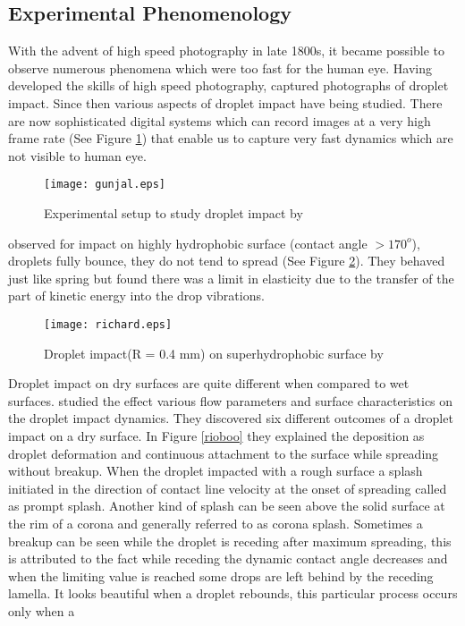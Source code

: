 \subsection{Experimental Phenomenology}
With the advent of high speed photography in late 1800s, it became possible to observe numerous phenomena which were too fast for the human eye.
Having developed the skills of high speed photography, \cite{Worthington1908} captured photographs of droplet impact. Since then various aspects of
droplet impact have being studied. There are now sophisticated digital systems which can record images at a very high frame rate 
(See Figure \ref{gunjal}) that enable us to capture very fast dynamics which are not visible to human eye.
\begin{figure}[tbp]
\centering
 \texttt{[image: gunjal.eps]}
 \caption[Experimental setup to study droplet impact]{Experimental setup to study droplet impact by \cite{Gunjal2005}}
 \label{gunjal}
\end{figure}
\cite{Richard2000} observed for impact on highly hydrophobic surface (contact angle $ > 170^o$), droplets fully bounce, they 
do not tend to spread (See Figure \ref{richard}). They behaved just like spring but found there was a limit in elasticity due to the transfer
of the part of kinetic energy into the drop vibrations.
\begin{figure}[tbp]
\centering
 \texttt{[image: richard.eps]}
 \caption[Droplet impact on superhydrophobic surface]{Droplet impact(R = 0.4 mm) on superhydrophobic surface
 by \cite{Richard2000} }
 \label{richard}
\end{figure}
Droplet impact on dry surfaces are quite different when compared to wet surfaces. \cite{Rioboo2001} studied the effect
various flow parameters and surface characteristics on the droplet impact dynamics. They discovered six different outcomes of a droplet impact on 
a dry surface. In Figure \ref{rioboo} they explained the deposition as droplet deformation and continuous attachment to the surface while spreading without breakup. When
the droplet impacted with a rough surface a splash initiated in the direction of contact line velocity at the onset of spreading called as prompt splash.
Another kind of splash can be seen above the solid surface at the rim of a corona and generally referred to as corona splash.
Sometimes a breakup can be seen while the droplet is receding after maximum spreading, this is attributed to the fact while receding the dynamic contact angle decreases and when 
the limiting value is reached some drops are left behind by the receding lamella. It looks beautiful when a droplet rebounds, this particular process occurs only when a
